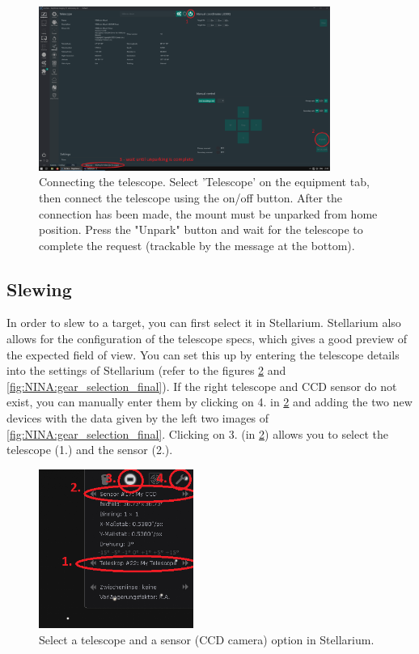 \documentclass[a4paper, 11pt, fleqn]{memoir}
\begin{document}
\begin{figure}
    \centering
    \includegraphics[width=0.85\textwidth]{figures/NINA/TelescopeDP.png}
    \caption{Connecting the telescope. Select 'Telescope' on the equipment tab, then connect the telescope using the on/off button. After the connection has been made, the mount must be unparked from home position. Press the "Unpark" button and wait for the telescope to complete the request (trackable by the message at the bottom).
    }  \label{fig:NINA:Telescope Connection}
\end{figure}

\subsection{Slewing}\label{sec:NINA:slewing}

In order to slew to a target, you can first select it in Stellarium. Stellarium also allows for the configuration of the telescope specs, which gives a good preview of the expected field of view. You can set this up by entering the telescope details into the settings of Stellarium (refer to the figures \ref{fig:NINA:choose_sensor_final} and \ref{fig:NINA:gear_selection_final}). If the right telescope and CCD sensor do not exist, you can manually enter them by clicking on 4. in \ref{fig:NINA:choose_sensor_final} and adding the two new devices with the data given by the left two images of \ref{fig:NINA:gear_selection_final}. Clicking on 3. (in \ref{fig:NINA:choose_sensor_final}) allows you to select the telescope (1.) and the sensor (2.).

\begin{figure}
    \centering
    \includegraphics[width=0.45\textwidth]{figures/NINA/choose_sensor_final.PNG}
    \caption{Select a telescope and a sensor (CCD camera) option in Stellarium.}
    \label{fig:NINA:choose_sensor_final}
\end{figure}
\end{document}

